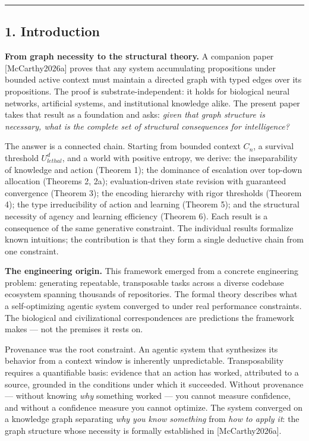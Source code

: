 \documentclass[
]{article}
\begin{document}
\begin{center}\rule{0.5\linewidth}{0.5pt}\end{center}

\subsection{1. Introduction}\label{introduction}

\textbf{From graph necessity to the structural theory.} A companion
paper {[}McCarthy2026a{]} proves that any system accumulating
propositions under bounded active context must maintain a directed graph
with typed edges over its propositions. The proof is
substrate-independent: it holds for biological neural networks,
artificial systems, and institutional knowledge alike. The present paper
takes that result as a foundation and asks: \emph{given that graph
structure is necessary, what is the complete set of structural
consequences for intelligence?}

The answer is a connected chain. Starting from bounded context \(C_n\),
a survival threshold \(U_{lethal}^d\), and a world with positive
entropy, we derive: the inseparability of knowledge and action (Theorem
1); the dominance of escalation over top-down allocation (Theorems 2,
2a); evaluation-driven state revision with guaranteed convergence
(Theorem 3); the encoding hierarchy with rigor thresholds (Theorem 4);
the type irreducibility of action and learning (Theorem 5); and the
structural necessity of agency and learning efficiency (Theorem 6). Each
result is a consequence of the same generative constraint. The
individual results formalize known intuitions; the contribution is that
they form a single deductive chain from one constraint.

\textbf{The engineering origin.} This framework emerged from a concrete
engineering problem: generating repeatable, transposable tasks across a
diverse codebase ecosystem spanning thousands of repositories. The
formal theory describes what a self-optimizing agentic system converged
to under real performance constraints. The biological and civilizational
correspondences are predictions the framework makes --- not the premises
it rests on.

Provenance was the root constraint. An agentic system that synthesizes
its behavior from a context window is inherently unpredictable.
Transposability requires a quantifiable basis: evidence that an action
has worked, attributed to a source, grounded in the conditions under
which it succeeded. Without provenance --- without knowing \emph{why}
something worked --- you cannot measure confidence, and without a
confidence measure you cannot optimize. The system converged on a
knowledge graph separating \emph{why you know something} from
\emph{how to apply it}: the graph structure whose necessity is formally
established in {[}McCarthy2026a{]}.
\end{document}
